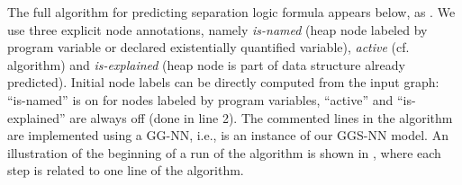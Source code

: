 \documentclass{article} \usepackage{iclr2016_conference,times}
\newcommand{\OurMethodMinorShort}{GG-NN}
\newcommand{\OurMethodShort}{GGS-NN}
\begin{document}
The full algorithm for predicting separation logic formula appears below, as
.
We use three explicit node annotations, namely \emph{is-named} (heap node labeled by
program variable or declared existentially quantified variable), \emph{active} (cf. algorithm) and \emph{is-explained} (heap node is
part of data structure already predicted).
Initial node labels can be directly computed from the input graph: ``is-named''
is on for nodes labeled by program variables, ``active'' and ``is-explained''
are always off (done in line 2).
The commented lines in the algorithm are implemented using a
\OurMethodMinorShort, i.e.,  is an instance of
our \OurMethodShort{} model.
An illustration of the beginning of a run of the algorithm is shown in
, where each step is related to one line of the
algorithm.
\end{document}
